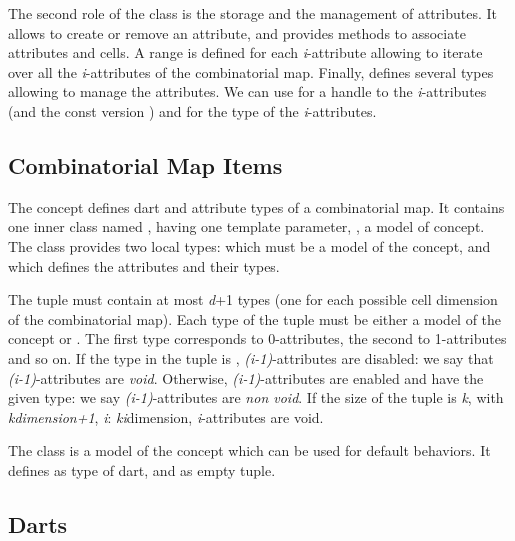 The second role of the class  is the storage
and the management of attributes.  It allows to create or remove an
attribute, and provides methods to associate attributes and cells.
A range is defined for each \emph{i}-attribute allowing to iterate
over all the \emph{i}-attributes of the combinatorial map.  Finally,
 defines several types allowing to manage the
attributes. We can use
 for a handle to the
\emph{i}-attributes (and the const version
) and
 for the type of the
\emph{i}-attributes.

\subsection{Combinatorial Map Items}\label{ssec-item}

The  concept defines dart and attribute
types of a combinatorial map. It contains one inner class named
, having one template parameter, , a model
of  concept.  The  class
provides two local types:  which must be a model of the
 concept, and  which defines the attributes
and their types.

The  tuple must contain at most \emph{d}+1 types (one for
each possible cell dimension of the combinatorial map).  Each type of
the tuple must be either a model of the  concept or
.  The first type corresponds to 0-attributes, the second to
1-attributes and so on. If the  type in the tuple is  
, \emph{(i-1)}-attributes are disabled: we say that
\emph{(i-1)}-attributes are \emph{void}.  Otherwise, \emph{(i-1)}-attributes are
enabled and have the given type: we say \emph{(i-1)}-attributes are
\emph{non void}.  If the size of the tuple is \emph{k}, with \emph{k}\mylt{}\emph{dimension+1}, \myforall{}\emph{i}: \emph{k}\myleq{}\emph{i}\myleq{}dimension, 
\emph{i}-attributes are void.

The class  is a model of the
 concept which can be used for default behaviors.
It defines  as type of dart, and
 as empty tuple.

\subsection{Darts}\label{ssec-darts}

